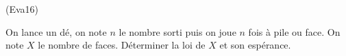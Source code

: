 \begin{tiny}(Eva16)\end{tiny} On lance un dé, on note $n$ le nombre sorti puis on joue $n$ fois à pile ou face. On note $X$ le nombre de faces. Déterminer la loi de $X$ et son espérance.  